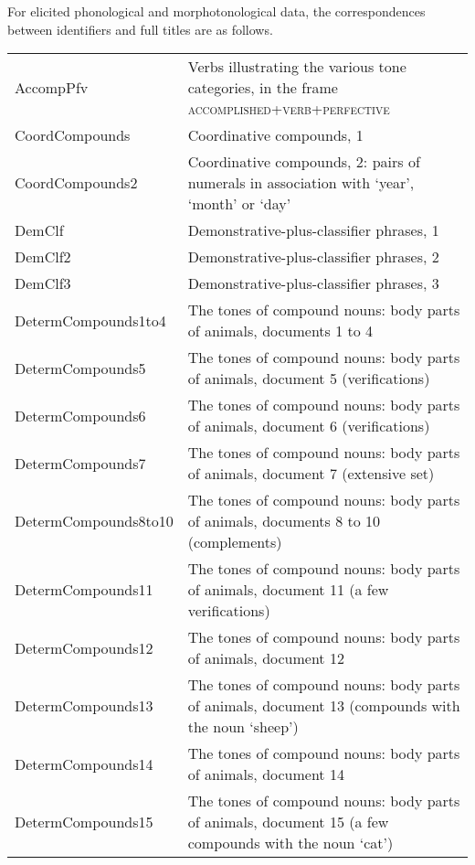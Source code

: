 \begin{refsection}
\clearpage

For elicited phonological and morphotonological data, the correspondences between identifiers and full titles are as follows.

\begin{table}[H]
  {\renewcommand{\arraystretch}{1.35}
    \begin{tabularx}{\textwidth}{ @{}l Q }
      AccompPfv & Verbs illustrating the various tone categories, in the frame \textsc{accomplished+verb+perfective}\\
      CoordCompounds & Coordinative compounds, 1\\
      CoordCompounds2 & Coordinative compounds, 2: pairs of numerals in association with ‘year', ‘month' or ‘day'\\
      DemClf & Demonstrative-plus-classifier phrases, 1\\
      DemClf2 & Demonstrative-plus-classifier phrases, 2\\
      DemClf3 & Demonstrative-plus-classifier phrases, 3\\
      DetermCompounds1to4 & The tones of compound nouns: body parts of animals, documents 1 to 4\\
      DetermCompounds5 & The tones of compound nouns: body parts of animals, document 5 (verifications)\\
      DetermCompounds6 & The tones of compound nouns: body parts of animals, document 6 (verifications)\\
      DetermCompounds7 & The tones of compound nouns: body parts of animals, document 7 (extensive set)\\
      DetermCompounds8to10 & The tones of compound nouns: body parts of animals, documents 8 to 10 (complements)\\
      DetermCompounds11 & The tones of compound nouns: body parts of animals, document 11 (a few verifications)\\
      DetermCompounds12 & The tones of compound nouns: body parts of animals, document 12\\
      DetermCompounds13 & The tones of compound nouns: body parts of animals, document 13 (compounds with the noun ‘sheep')\\
      DetermCompounds14 & The tones of compound nouns: body parts of animals, document 14\\
      DetermCompounds15 & The tones of compound nouns: body parts of animals, document 15 (a few compounds with the noun ‘cat')\\
    \end{tabularx}}
  \end{table}
      

\end{refsection}
